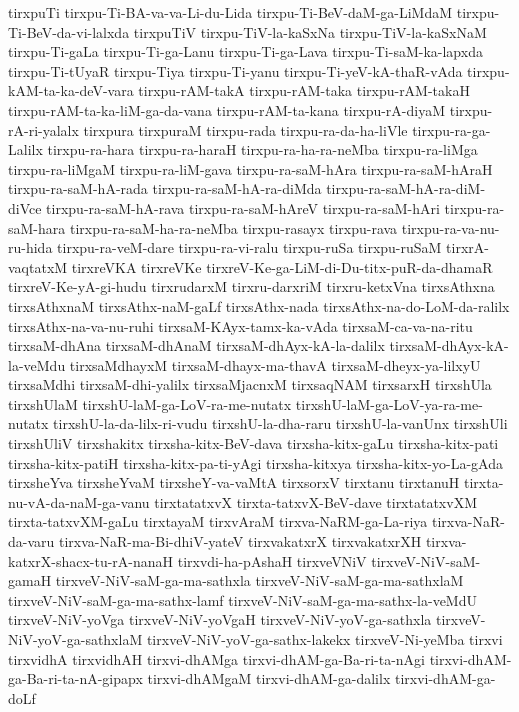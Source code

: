 {tirxpuTi
tirxpu-Ti-BA-va-va-Li-du-Lida
tirxpu-Ti-BeV-daM-ga-LiMdaM
tirxpu-Ti-BeV-da-vi-lalxda
tirxpuTiV
tirxpu-TiV-la-kaSxNa
tirxpu-TiV-la-kaSxNaM
tirxpu-Ti-gaLa
tirxpu-Ti-ga-Lanu
tirxpu-Ti-ga-Lava
tirxpu-Ti-saM-ka-lapxda
tirxpu-Ti-tUyaR
tirxpu-Tiya
tirxpu-Ti-yanu
tirxpu-Ti-yeV-kA-thaR-vAda
tirxpu-kAM-ta-ka-deV-vara
tirxpu-rAM-takA
tirxpu-rAM-taka
tirxpu-rAM-takaH
tirxpu-rAM-ta-ka-liM-ga-da-vana
tirxpu-rAM-ta-kana
tirxpu-rA-diyaM
tirxpu-rA-ri-yalalx
tirxpura
tirxpuraM
tirxpu-rada
tirxpu-ra-da-ha-liVle
tirxpu-ra-ga-Lalilx
tirxpu-ra-hara
tirxpu-ra-haraH
tirxpu-ra-ha-ra-neMba
tirxpu-ra-liMga
tirxpu-ra-liMgaM
tirxpu-ra-liM-gava
tirxpu-ra-saM-hAra
tirxpu-ra-saM-hAraH
tirxpu-ra-saM-hA-rada
tirxpu-ra-saM-hA-ra-diMda
tirxpu-ra-saM-hA-ra-diM-diVce
tirxpu-ra-saM-hA-rava
tirxpu-ra-saM-hAreV
tirxpu-ra-saM-hAri
tirxpu-ra-saM-hara
tirxpu-ra-saM-ha-ra-neMba
tirxpu-rasayx
tirxpu-rava
tirxpu-ra-va-nu-ru-hida
tirxpu-ra-veM-dare
tirxpu-ra-vi-ralu
tirxpu-ruSa
tirxpu-ruSaM
tirxrA-vaqtatxM
tirxreVKA
tirxreVKe
tirxreV-Ke-ga-LiM-di-Du-titx-puR-da-dhamaR
tirxreV-Ke-yA-gi-hudu
tirxrudarxM
tirxru-darxriM
tirxru-ketxVna
tirxsAthxna
tirxsAthxnaM
tirxsAthx-naM-gaLf
tirxsAthx-nada
tirxsAthx-na-do-LoM-da-ralilx
tirxsAthx-na-va-nu-ruhi
tirxsaM-KAyx-tamx-ka-vAda
tirxsaM-ca-va-na-ritu
tirxsaM-dhAna
tirxsaM-dhAnaM
tirxsaM-dhAyx-kA-la-dalilx
tirxsaM-dhAyx-kA-la-veMdu
tirxsaMdhayxM
tirxsaM-dhayx-ma-thavA
tirxsaM-dheyx-ya-lilxyU
tirxsaMdhi
tirxsaM-dhi-yalilx
tirxsaMjacnxM
tirxsaqNAM
tirxsarxH
tirxshUla
tirxshUlaM
tirxshU-laM-ga-LoV-ra-me-nutatx
tirxshU-laM-ga-LoV-ya-ra-me-nutatx
tirxshU-la-da-lilx-ri-vudu
tirxshU-la-dha-raru
tirxshU-la-vanUnx
tirxshUli
tirxshUliV
tirxshakitx
tirxsha-kitx-BeV-dava
tirxsha-kitx-gaLu
tirxsha-kitx-pati
tirxsha-kitx-patiH
tirxsha-kitx-pa-ti-yAgi
tirxsha-kitxya
tirxsha-kitx-yo-La-gAda
tirxsheYva
tirxsheYvaM
tirxsheY-va-vaMtA
tirxsorxV
tirxtanu
tirxtanuH
tirxta-nu-vA-da-naM-ga-vanu
tirxtatatxvX
tirxta-tatxvX-BeV-dave
tirxtatatxvXM
tirxta-tatxvXM-gaLu
tirxtayaM
tirxvAraM
tirxva-NaRM-ga-La-riya
tirxva-NaR-da-varu
tirxva-NaR-ma-Bi-dhiV-yateV
tirxvakatxrX
tirxvakatxrXH
tirxva-katxrX-shacx-tu-rA-nanaH
tirxvdi-ha-pAshaH
tirxveVNiV
tirxveV-NiV-saM-gamaH
tirxveV-NiV-saM-ga-ma-sathxla
tirxveV-NiV-saM-ga-ma-sathxlaM
tirxveV-NiV-saM-ga-ma-sathx-lamf
tirxveV-NiV-saM-ga-ma-sathx-la-veMdU
tirxveV-NiV-yoVga
tirxveV-NiV-yoVgaH
tirxveV-NiV-yoV-ga-sathxla
tirxveV-NiV-yoV-ga-sathxlaM
tirxveV-NiV-yoV-ga-sathx-lakekx
tirxveV-Ni-yeMba
tirxvi
tirxvidhA
tirxvidhAH
tirxvi-dhAMga
tirxvi-dhAM-ga-Ba-ri-ta-nAgi
tirxvi-dhAM-ga-Ba-ri-ta-nA-gipapx
tirxvi-dhAMgaM
tirxvi-dhAM-ga-dalilx
tirxvi-dhAM-ga-doLf
}
